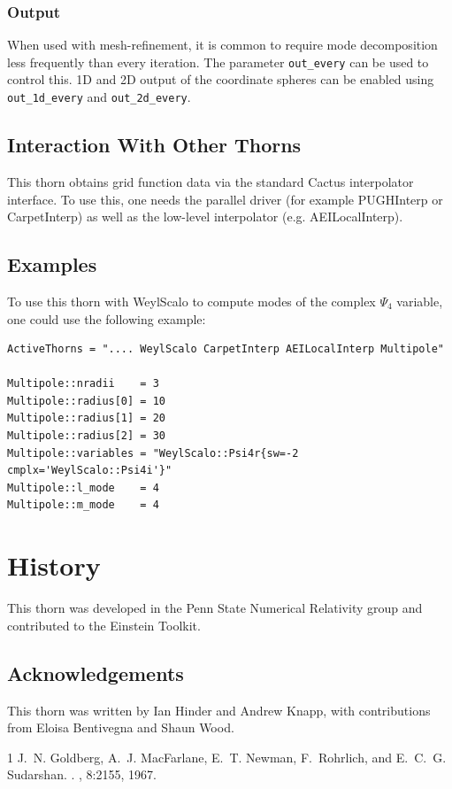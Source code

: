 \documentclass{article}
\begin{document}
\subsubsection{Output}
When used with mesh-refinement, it is common to require mode
decomposition less frequently than every iteration.  The parameter
\verb|out_every| can be used to control this.  1D and 2D output of the
coordinate spheres can be enabled using \verb|out_1d_every| and
\verb|out_2d_every|.

\subsection{Interaction With Other Thorns}

This thorn obtains grid function data via the standard Cactus
interpolator interface.  To use this, one needs the parallel driver
(for example PUGHInterp or CarpetInterp) as well as the low-level
interpolator (e.g. AEILocalInterp).

\subsection{Examples}

To use this thorn with WeylScalo to compute modes of the complex
$\Psi_4$ variable, one could use the following example:

\begin{verbatim}
ActiveThorns = ".... WeylScalo CarpetInterp AEILocalInterp Multipole"

Multipole::nradii    = 3
Multipole::radius[0] = 10
Multipole::radius[1] = 20
Multipole::radius[2] = 30
Multipole::variables = "WeylScalo::Psi4r{sw=-2 cmplx='WeylScalo::Psi4i'}"
Multipole::l_mode    = 4
Multipole::m_mode    = 4
\end{verbatim}

\section{History}

This thorn was developed in the Penn State Numerical Relativity group
and contributed to the Einstein Toolkit.

\subsection{Acknowledgements}

This thorn was written by Ian Hinder and Andrew Knapp, with
contributions from Eloisa Bentivegna and Shaun Wood.

%
%

\begin{thebibliography}{1}
J.~N. Goldberg, A.~J. MacFarlane, E.~T. Newman, F.~Rohrlich, and E.~C.~G.
  Sudarshan.
.
, 8:2155, 1967.
\end{thebibliography}

\end{document}
